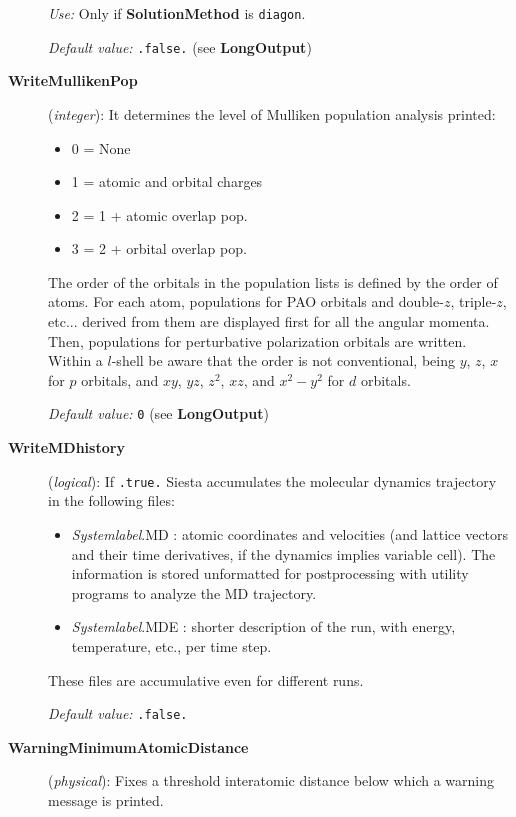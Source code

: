 \documentclass[11pt]{article}
\begin{document}
\begin{description}
{\it Use:} Only if {\bf SolutionMethod} is {\tt diagon}.
 
{\it Default value:} {\tt .false.} (see {\bf LongOutput})


\item[{\bf WriteMullikenPop}] ({\it integer}): 
It determines the level of Mulliken population analysis printed:
\begin{itemize}
\item 0 = None
\item 1 = atomic and orbital charges
\item 2 = 1 + atomic overlap pop.
\item 3 = 2 + orbital overlap pop.
\end{itemize}
The order of the orbitals in the population lists is defined
by the order of atoms. For each atom, populations for PAO orbitals and
double-$z$, triple-$z$, etc... derived from them are displayed first for 
all the angular momenta. Then, populations for perturbative polarization
orbitals are written.
Within a $l$-shell be aware that the order is not
conventional, being $y$, $z$, $x$ for $p$ orbitals, and
$xy$, $yz$, $z^2$, $xz$, and $x^2-y^2$ for $d$ orbitals. 

{\it Default value:} {\tt 0} (see {\bf LongOutput})


 
\item[{\bf WriteMDhistory}] ({\it logical}):
If {\tt .true.} {\sc Siesta} accumulates the molecular dynamics
trajectory in the following files:
\begin{itemize}
\item
{\it Systemlabel}.MD : atomic coordinates and velocities (and
lattice vectors and their time derivatives, if the dynamics implies
variable cell). The information is stored unformatted for postprocessing
with utility programs to analyze the MD trajectory. 
\item
{\it Systemlabel}.MDE : shorter description of the run, with energy,
temperature, etc., per time step.
\end{itemize}
These files are accumulative even for different runs.
 
{\it Default value:} {\tt .false.}

\item[{\bf WarningMinimumAtomicDistance}] ({\it physical}): 
Fixes a threshold interatomic distance below which a warning
message is printed.


\end{description}
\end{document}
